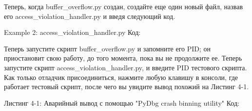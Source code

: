 \documentclass[12pt, a4paper, oneside]{book}
\begin{document}



Теперь, когда buffer\_overflow.py создан, создайте еще один новый файл, назвав его access\_violation\_handler.py и введя следующий код.

Example 2: access\_violation\_handler.py
Код:








Теперь запустите скрипт buffer\_overflow.py и запомните его PID; он приостановит свою работу, до того момента, пока вы не продолжите ее. Теперь запустите скрипт access\_violation\_handler.py, и введите PID тестового скрипта. Как только отладчик присоединиться, нажмите любую клавишу в консоли, где работает тестовый скрипт, после чего вы увидите вывод похожий на Листинг 4-1.

Листинг 4-1: Аварийный вывод с помощью "PyDbg crash binning utility"
Код:

\end{document}
